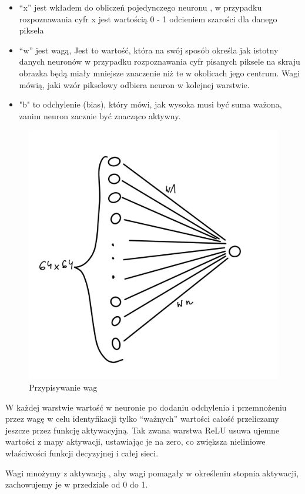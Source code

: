 \documentclass[brudnopis]{xmgr}
\begin{document}
\begin{itemize}
\item “x” jest wkładem do obliczeń pojedynczego neuronu , w przypadku rozpoznawania cyfr x jest wartością 0 - 1 odcieniem szarości dla danego piksela
\item “w” jest wagą, Jest to wartość, która na swój sposób określa jak istotny danych neuronów w przypadku rozpoznawania cyfr pisanych piksele na skraju obrazka będą miały mniejsze znaczenie niż te w okolicach jego centrum. Wagi mówią, jaki wzór pikselowy odbiera neuron w kolejnej warstwie.
\item "b" to odchylenie (bias), który mówi, jak wysoka musi być suma ważona, zanim neuron zacznie być znacząco aktywny.
\end{itemize}

\begin{figure}[!tbh]
\centering
\includegraphics[width=.8\hsize]{fig/3}
\caption{Przypisywanie wag\label{RYS.3}}
\end{figure}



W każdej warstwie  wartość w neuronie po dodaniu odchylenia i przemnożeniu przez wagę w celu identyfikacji tylko “ważnych” wartości całość przeliczamy jeszcze przez funkcję aktywacyjną. 
Tak zwana warstwa ReLU usuwa ujemne wartości z mapy aktywacji, ustawiając je na zero, co zwiększa nieliniowe właściwości funkcji decyzyjnej i całej sieci.


 Wagi mnożymy z aktywacją ,  aby wagi pomagały w określeniu stopnia aktywacji, zachowujemy je w przedziale od 0 do 1.
 
\end{document}
